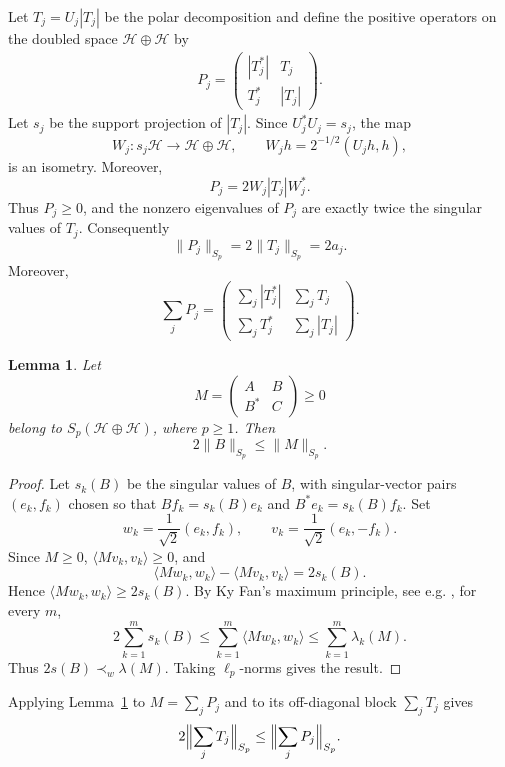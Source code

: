 \documentclass[11pt]{article}
\newtheorem{lemma}[theorem]{Lemma}
\theoremstyle{definition}
\newcommand{\1}{\mathbf{1}}
\begin{document}
Let $T_j=U_j|T_j|$ be the polar decomposition and define the positive operators on the doubled space $\mathcal{H}\oplus\mathcal{H}$ by
\begin{align}\label{dadeb}
P_j=\begin{pmatrix}|T_j^*|&T_j\\T_j^*&|T_j|\end{pmatrix}.
\end{align}
Let $s_j$ be the support projection of $|T_j|$. Since $U_j^*U_j=s_j$, the map
\[
W_j:s_j\mathcal H\to \mathcal H\oplus\mathcal H,\qquad
W_jh=2^{-1/2}(U_jh,h),
\]
is an isometry. Moreover,
\[
P_j=2W_j|T_j|W_j^*.
\]
Thus $P_j\ge0$, and the nonzero eigenvalues of $P_j$ are exactly twice the
singular values of $T_j$. Consequently
\[
\|P_j\|_{S_p}=2\|T_j\|_{S_p}=2a_j.
\]
Moreover,
\[
\sum_j P_j=\begin{pmatrix}\sum_j|T_j^*|&\sum_j T_j\\\sum_j T_j^*&\sum_j|T_j|\end{pmatrix}.
\]

\begin{lemma}\label{lem:offdiag}
Let
\[
M=\begin{pmatrix}A&B\\B^*&C\end{pmatrix}\ge0
\]
belong to $S_p(\mathcal H\oplus\mathcal H)$, where $p\ge1$. Then
\[
2\|B\|_{S_p}\le \|M\|_{S_p}.
\]
\end{lemma}

\begin{proof}
Let $s_k(B)$ be the singular values of $B$, with singular-vector pairs
$(e_k,f_k)$ chosen so that $Bf_k=s_k(B)e_k$ and $B^*e_k=s_k(B)f_k$. Set
\[
w_k=\frac{1}{\sqrt2}(e_k,f_k),\qquad
v_k=\frac{1}{\sqrt2}(e_k,-f_k).
\]
Since $M\ge0$, $\langle Mv_k,v_k\rangle\ge0$, and
\[
\langle Mw_k,w_k\rangle-\langle Mv_k,v_k\rangle=2s_k(B).
\]
Hence $\langle Mw_k,w_k\rangle\ge 2s_k(B)$. By Ky Fan's maximum principle, see e.g. \cite[Chapter III]{BhatiaMatrixAnalysis}, 
for every $m$,
\[
2\sum_{k=1}^m s_k(B)
\le
\sum_{k=1}^m\langle Mw_k,w_k\rangle
\le
\sum_{k=1}^m \lambda_k(M).
\]
Thus $2s(B)\prec_w \lambda(M)$. Taking $\ell_p$-norms gives the result.
\end{proof}
Applying Lemma~\ref{lem:offdiag} to $M=\sum_j P_j$ and to its off-diagonal
block $\sum_j T_j$ gives
\[
2\Bigl\|\sum_j T_j\Bigr\|_{S_p}\leq\Bigl\|\sum_j P_j\Bigr\|_{S_p}.
\]
\end{document}
